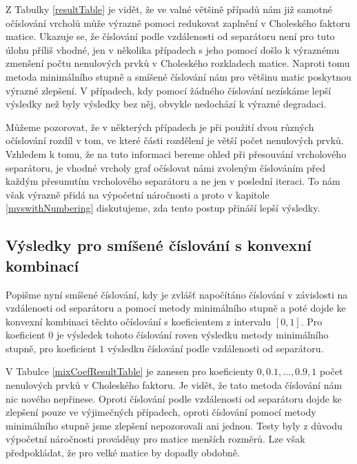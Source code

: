 \documentclass{ctuthesis}
\theoremstyle{plain}
\theoremstyle{definition}
\begin{document}
Z Tabulky \ref{resultTable} je vidět, že ve valné většině případů nám již samotné očíslování vrcholů může výrazně pomoci redukovat zaplnění v Choleského faktoru matice. Ukazuje se, že číslování podle vzdálenosti od separátoru není pro tuto úlohu příliš vhodné, jen v několika případech s jeho pomocí došlo k výraznému zmenšení počtu nenulových prvků v Choleského rozkladech matice. Naproti tomu metoda minimálního stupně a smíšené číslování nám pro většinu matic poskytnou výrazné zlepšení. V případech, kdy pomocí žádného číslování nezískáme lepší výsledky než byly výsledky bez něj, obvykle nedochází k výrazné degradaci.

Můžeme pozorovat, že v některých případech je při použití dvou různých očíslování rozdíl v tom, ve které části rozdělení je větší počet nenulových prvků. Vzhledem k tomu, že na tuto informaci bereme ohled při přesouvání vrcholového separátoru, je vhodné vrcholy graf očíslovat námi zvoleným číslováním před každým přesunutím vrcholového separátoru a ne jen v poslední iteraci. To nám však výrazně přidá na výpočetní náročnosti a proto v kapitole \ref{mvswithNumbering} diskutujeme, zda tento postup přináší lepší výsledky.

\subsection{Výsledky pro smíšené číslování s konvexní kombinací}

Popišme nyní smíšené číslování, kdy je zvlášť napočítáno číslování v závislosti na vzdálenosti od separátoru a pomocí metody minimálního stupně a poté dojde ke konvexní kombinaci těchto očíslování s koeficientem z intervalu $[0,1]$. Pro koeficient $0$ je výsledek tohoto číslování roven výsledku metody minimálního stupně, pro koeficient $1$ výsledku číslování podle vzdálenosti od separátoru.

V Tabulce \ref{mixCoefResultTable} je zanesen pro koeficienty $0, 0.1,\ldots,0.9, 1$ počet nenulových prvků v Choleského faktoru. Je vidět, že tato metoda číslování nám nic nového nepřinese. Oproti číslování podle vzdálenosti od separátoru dojde ke zlepšení pouze ve výjimečných případech, oproti číslování pomocí metody minimálního stupně jsme zlepšení nepozorovali ani jednou. Testy byly z důvodu výpočetní náročnosti prováděny pro matice menších rozměrů. Lze však předpokládat, že pro velké matice by dopadly obdobně.
\end{document}
